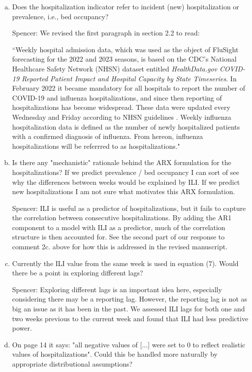 \documentclass{article}
\newcommand{\spencer}[1]{{\color{blue} Spencer: #1}}
\begin{document}
\begin{enumerate}[1.]
\begin{enumerate}[a.]
\item Does the hospitalization indicator refer to incident (new) hospitalization or prevalence, i.e.,
bed occupancy?

\spencer{We revised the first paragraph in section 2.2 to read:

``Weekly hospital admission data, which was used as the object of FluSight 
forecasting for the 
2022 and 2023 seasons, is based on the CDC's National Healthcare Safety 
Network (NHSN) dataset entitled \textit{HealthData.gov COVID-19 Reported 
Patient Impact and Hospital Capacity by State Timeseries}. 
In February 2022 it became mandatory for 
all hospitals to report the number of COVID-19 and influenza hospitalizations, 
and since then reporting of hospitalizations has become widespread. These data 
were updated every Wednesday and Friday according to NHSN guidelines 
\cite[]{healthdata2024covidts}. Weekly influenza hospitalization data is
defined as the number of newly hospitalized patients with a confirmed diagnosis 
of influenza. From hereon, influenza hospitalizations
will be referrred to as hospitalizations."}



\item Is there any "mechanistic" rationale behind the ARX formulation for the hospitalizations? If we
predict prevalence / bed occupancy I can sort of see why the differences between weeks would be
explained by ILI. If we predict new hospitalizations I am not sure what motivates this ARX
formulation.

\spencer{ILI is useful as a predictor of hospitalizations, but it fails to 
capture the correlation between consecutive hospitalizations. By adding the 
AR1 component to a model with ILI as a predictor, much of the correlation
structure is then accounted for. 
See the second part of our response to comment 2c. above for how this is 
addressed in the revised manuscript.}

\item Currently the ILI value from the same week is used in equation (7). Would there be a point in
exploring different lags?


\spencer{Exploring different lags is an important idea here, especially considering there
may be a reporting lag. However, the reporting lag is not as big an issue as it has
been in the past. We assessed ILI lags for both one and two weeks previous to the current
week and found that ILI had less predictive power. }

\item On page 14 it says: "all negative values of [...] were set to 0 to reflect realistic values of
hospitalizations". Could this be handled more naturally by appropriate distributional assumptions?


\end{enumerate}
\end{enumerate}
\end{document}
